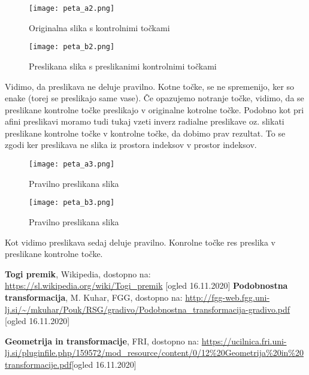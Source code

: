 \documentclass[12pt,a4paper]{article}
\begin{document}
\pagebreak

\begin{figure}[h!]
  \begin{center}
    \texttt{[image: peta\_a2.png]}
    \caption{Originalna slika s kontrolnimi točkami}
    \label{fig:}
  \end{center}
\end{figure}
\begin{figure}[h!]
  \begin{center}
    \texttt{[image: peta\_b2.png]}
    \caption{Preslikana slika s preslikanimi kontrolnimi točkami}
    \label{fig:}
  \end{center}
\end{figure}
Vidimo, da preslikava ne deluje pravilno. Kotne točke, se ne spremenijo, ker so enake (torej se preslikajo same vase). Če opazujemo notranje točke, vidimo, da se preslikane kontrolne točke preslikajo v originalne kotrolne točke. Podobno kot pri afini preslikavi moramo tudi tukaj vzeti inverz radialne preslikave oz. slikati preslikane kontrolne točke v kontrolne točke, da dobimo prav rezultat. To se zgodi ker preslikava ne slika iz prostora indeksov v prostor indeksov. 

\begin{figure}[h!]
  \begin{center}
    \texttt{[image: peta\_a3.png]}
    \caption{Pravilno preslikana slika}
    \label{fig:}
  \end{center}
\end{figure}
\begin{figure}[h!]
  \begin{center}
    \texttt{[image: peta\_b3.png]}
    \caption{Pravilno preslikana slika}
    \label{fig:}
  \end{center}
\end{figure}

Kot vidimo preslikava sedaj deluje pravilno. Konrolne točke res preslika v preslikane kontrolne točke. 

\begin{thebibliography}{9}
\textbf{Togi premik}, Wikipedia, dostopno na: \url{https://sl.wikipedia.org/wiki/Togi_premik} [ogled 16.11.2020]
\textbf{Podobnostna transformacija}, M. Kuhar, FGG, dostopno na: \url{http://fgg-web.fgg.uni-lj.si/~/mkuhar/Pouk/RSG/gradivo/Podobnostna_transformacija-gradivo.pdf} [ogled 16.11.2020]

\textbf{Geometrija in transformacije}, FRI, dostopno na: \url{https://ucilnica.fri.uni-lj.si/pluginfile.php/159572/mod_resource/content/0/12%20Geometrija%20in%20transformacije.pdf}[ogled 16.11.2020]

\end{thebibliography}
\end{document}
